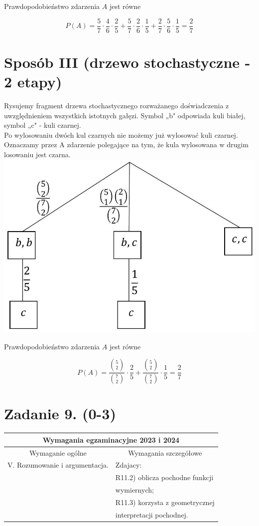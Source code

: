 \documentclass[10pt]{article}
\begin{document}
Prawdopodobieństwo zdarzenia $A$ jest równe

$$
P(A)=\frac{5}{7} \cdot \frac{4}{6} \cdot \frac{2}{5}+\frac{5}{7} \cdot \frac{2}{6} \cdot \frac{1}{5}+\frac{2}{7} \cdot \frac{5}{6} \cdot \frac{1}{5}=\frac{2}{7}
$$

\section*{Sposób III (drzewo stochastyczne - 2 etapy)}
Rysujemy fragment drzewa stochastycznego rozważanego doświadczenia z uwzględnieniem wszystkich istotnych gałęzi. Symbol „b" odpowiada kuli białej, symbol „c" - kuli czarnej.\\
Po wylosowaniu dwóch kul czarnych nie możemy już wylosować kuli czarnej.\\
Oznaczamy przez A zdarzenie polegające na tym, że kula wylosowana w drugim losowaniu jest czarna.\\
\includegraphics[max width=\textwidth, center]{2025_02_07_dcb3d059df06a3930b0ag-18}

Prawdopodobieństwo zdarzenia $A$ jest równe

$$
P(A)=\frac{\binom{5}{2}}{\binom{7}{2}} \cdot \frac{2}{5}+\frac{\binom{5}{2}}{\binom{7}{2}} \cdot \frac{1}{5}=\frac{2}{7}
$$

\section*{Zadanie 9. (0-3)}
\begin{center}
\begin{tabular}{|l|l|}
\hline
\multicolumn{2}{|c|}{Wymagania egzaminacyjne 2023 i 2024} \\
\hline
\multicolumn{1}{|c|}{Wymaganie ogólne} & \multicolumn{1}{|c|}{Wymagania szczegółowe} \\
\hline
V. Rozumowanie i argumentacja. & Zdajacy: \\
 & R11.2) oblicza pochodne funkcji \\
 & wymiernych; \\
 & R11.3) korzysta z geometrycznej \\
 & interpretacji pochodnej. \\
\hline
\end{tabular}
\end{center}
\end{document}
